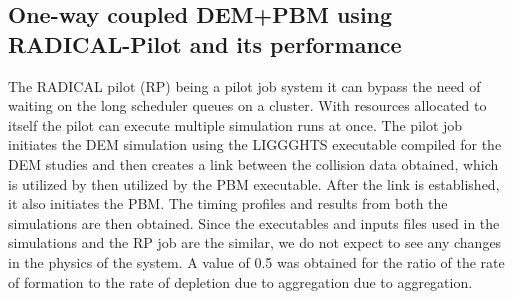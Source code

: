 \documentclass[preprint,11pt,authoryear]{elsarticle}
\begin{document}
\subsection{One-way coupled DEM+PBM using RADICAL-Pilot and its performance} 
 The RADICAL pilot (RP) being a pilot job system it can bypass the need of waiting on the long scheduler
queues on a cluster. With resources allocated to itself the pilot can execute multiple simulation runs 
at once. The pilot job initiates the DEM simulation using the LIGGGHTS executable compiled for the DEM
studies and then creates a link between the collision data obtained, which is utilized by then utilized 
by the PBM executable. After the link is established, it also initiates the PBM. The timing profiles and
results from both the simulations are then obtained. Since the executables and inputs files used in the 
simulations and the RP job are the similar, we do not expect to see any changes in the physics of the 
system. A value of 0.5 was obtained for the ratio of the rate of formation to the rate of depletion due to aggregation
due to aggregation.
\end{document}

